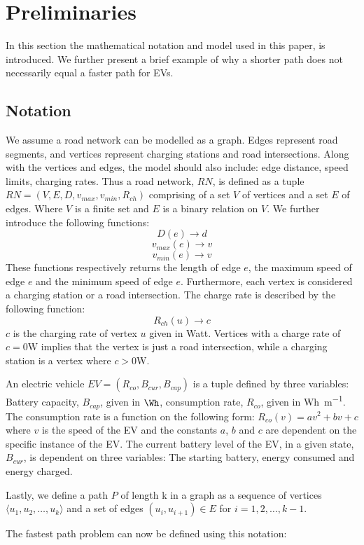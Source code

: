 \section{Preliminaries} \label{sec:notation}
In this section the mathematical notation and model used in this paper, is introduced. We further present a brief example of why a shorter path does not necessarily equal a faster path for EVs. 

\subsection{Notation}
We assume a road network can be modelled as a graph. Edges represent road segments, and vertices represent charging stations and road intersections. Along with the vertices and edges, the model should also include: edge distance, speed limits, charging rates. Thus a road network, $RN$, is defined as a tuple $RN=(V,E,D,v_{max},v_{min},R_{ch})$ comprising of a set $V$ of vertices and a set $E$ of edges. Where $V$ is a finite set and $E$ is a binary relation on $V$. We further introduce the following functions:
\[ D(e)\rightarrow d \] 
\[ v_{max}(e)\rightarrow v \]
\[ v_{min}(e)\rightarrow v \]
These functions respectively returns the length of edge $e$, the maximum speed of edge $e$ and the minimum speed of edge $e$. Furthermore, each vertex is considered a charging station or a road intersection. The charge rate is described by the following function:
\[R_{ch}(u)\rightarrow c\]
$c$ is the charging rate of vertex $u$ given in Watt. Vertices with a charge rate of $c = 0\si{\W}$ implies that the vertex is just a road intersection, while a charging station is a vertex where $c > 0\si{\W}$. 

An electric vehicle $EV=(R_{co},B_{cur},B_{cap})$ is a tuple defined by three variables: Battery capacity, $B_{cap}$, given in $\si{\Wh}$, consumption rate, $R_{co}$, given in \si{Wh\per m}. The consumption rate is a function on the following form:
\( R_{co}(v)=av^2+bv+c \)
where $v$ is the speed of the EV and the constants $a$, $b$ and $c$ are dependent on the specific instance of the EV. The current battery level of the EV, in a given state, $B_{cur}$, is dependent on three variables: The starting battery, energy consumed and energy charged.

Lastly, we define a path $P$ of length k in a graph as a sequence of vertices $\langle u_1,u_2,\dots,u_k \rangle$ and a set of edges $(u_{i},u_{i+1})\in E$ for $i=1,2,\dots,k-1$.

The fastest path problem can now be defined using this notation:

